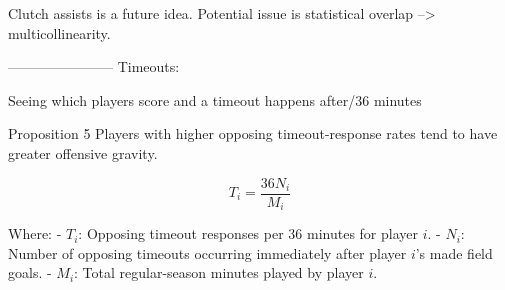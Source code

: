 Clutch assists is a future idea. Potential issue is statistical overlap --> multicollinearity.




-----------------------
Timeouts:

Seeing which players score and a timeout happens after/36 minutes

Proposition 5
Players with higher opposing timeout-response rates tend to have greater offensive gravity.

\[
\boxed{T_i=\frac{36N_i}{M_i}}
\]

Where:
- \(T_i\): Opposing timeout responses per 36 minutes for player \(i\).
- \(N_i\): Number of opposing timeouts occurring immediately after player \(i\)'s made field goals.
- \(M_i\): Total regular-season minutes played by player \(i\).